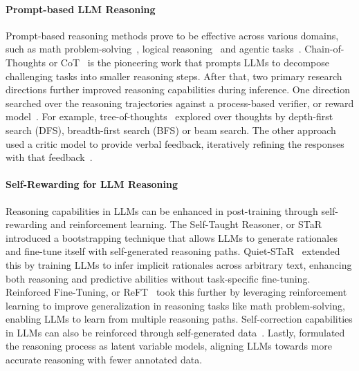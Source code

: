 \paragraph{Prompt-based LLM Reasoning}
Prompt-based reasoning methods prove to be effective across various domains, 
such as math problem-solving~\citep{polu2020generative,hendrycks2021measuring,DBLP:journals/corr/abs-2110-14168}, logical reasoning~\citep{sprague2024cot} and agentic tasks~\citep{DBLP:conf/iclr/YaoZYDSN023, DBLP:conf/nips/ShinnCGNY23,yao2023retroformer}. Chain-of-Thoughts or CoT~\citep{DBLP:conf/nips/Wei0SBIXCLZ22} is the pioneering work that prompts LLMs to decompose challenging tasks into smaller reasoning steps. After that, two primary research directions further improved reasoning capabilities during inference. One direction searched over the reasoning trajectories against a process-based verifier, or reward model~\citep{yao2024tree,DBLP:conf/aaai/BestaBKGPGGLNNH24,lightman2023let}. For example, tree-of-thoughts~\citep{yao2024tree} explored over thoughts by depth-first search (DFS), breadth-first search (BFS) or beam search. The other approach used a critic model to provide verbal feedback, iteratively refining the responses with that feedback~\citep{saunders2022self,DBLP:conf/nips/ShinnCGNY23,yao2023retroformer,NEURIPS2023_91edff07}. 

\paragraph{Self-Rewarding for LLM Reasoning}

Reasoning capabilities in LLMs can be enhanced in post-training through self-rewarding and reinforcement learning. The Self-Taught Reasoner, or STaR~\citep{zelikman2022star} introduced a bootstrapping technique that allows LLMs to generate rationales and fine-tune itself with self-generated reasoning paths. Quiet-STaR~\citep{zelikman2024quiet} extended this by training LLMs to infer implicit rationales across arbitrary text, enhancing both reasoning and predictive abilities without task-specific fine-tuning. Reinforced Fine-Tuning, or ReFT~\citep{trung2024reft} took this further by leveraging reinforcement learning to improve generalization in reasoning tasks like math problem-solving, enabling LLMs to learn from multiple reasoning paths. Self-correction capabilities in LLMs can also be reinforced through self-generated data~\citep{kumar2024training}. Lastly, \citet{hoffman2024training,hu2023amortizing} formulated the reasoning process as latent variable models, aligning LLMs towards more accurate reasoning with fewer annotated data.
